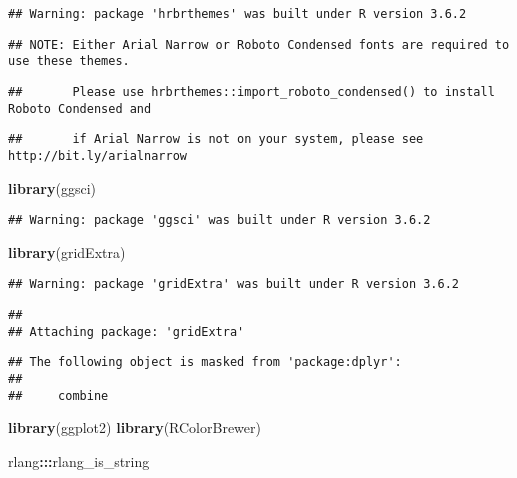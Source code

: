 \documentclass[
]{article}
\newenvironment{Shaded}{\begin{snugshade}}{\end{snugshade}}
\newcommand{\KeywordTok}[1]{\textcolor[rgb]{0.13,0.29,0.53}{\textbf{#1}}}
\newcommand{\NormalTok}[1]{#1}
\newcommand{\OperatorTok}[1]{\textcolor[rgb]{0.81,0.36,0.00}{\textbf{#1}}}
\begin{document}
\begin{verbatim}
## Warning: package 'hrbrthemes' was built under R version 3.6.2
\end{verbatim}

\begin{verbatim}
## NOTE: Either Arial Narrow or Roboto Condensed fonts are required to use these themes.
\end{verbatim}

\begin{verbatim}
##       Please use hrbrthemes::import_roboto_condensed() to install Roboto Condensed and
\end{verbatim}

\begin{verbatim}
##       if Arial Narrow is not on your system, please see http://bit.ly/arialnarrow
\end{verbatim}

\begin{Shaded}
\begin{Highlighting}[]
\KeywordTok{library}\NormalTok{(ggsci)}
\end{Highlighting}
\end{Shaded}

\begin{verbatim}
## Warning: package 'ggsci' was built under R version 3.6.2
\end{verbatim}

\begin{Shaded}
\begin{Highlighting}[]
\KeywordTok{library}\NormalTok{(gridExtra)}
\end{Highlighting}
\end{Shaded}

\begin{verbatim}
## Warning: package 'gridExtra' was built under R version 3.6.2
\end{verbatim}

\begin{verbatim}
## 
## Attaching package: 'gridExtra'
\end{verbatim}

\begin{verbatim}
## The following object is masked from 'package:dplyr':
## 
##     combine
\end{verbatim}

\begin{Shaded}
\begin{Highlighting}[]
\KeywordTok{library}\NormalTok{(ggplot2)}
\KeywordTok{library}\NormalTok{(RColorBrewer)}

\NormalTok{rlang}\OperatorTok{:::}\NormalTok{rlang_is_string}
\end{Highlighting}
\end{Shaded}
\end{document}
